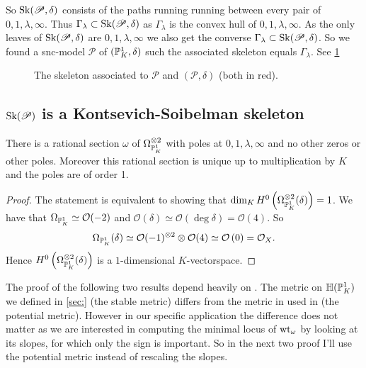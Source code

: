 So $\operatorname{Sk}(\mathscr P, \delta)$ consists of the paths running running between every pair of $0, 1, \lambda, \infty$. Thus $\Gamma_\lambda \subset \operatorname{Sk}(\mathscr P, \delta)$ as $\Gamma_\lambda$ is the convex hull of $0, 1, \lambda, \infty$.
As  the only leaves of $\operatorname{Sk}(\mathscr P, \delta)$ are $0, 1, \lambda, \infty$ we also get the converse $\Gamma_\lambda \subset  \operatorname{Sk}(\mathscr P, \delta)$. 
So we found a snc-model $\mathscr P$ of $(\mathbb{P}^{1}_K, \delta)$ such the associated skeleton equals $\Gamma_\lambda$. 
See \cref{fig:skeleton_of_the_pair}

\begin{figure}[ht]
    \centering
    \caption{The skeleton associated to $\mathscr P$ and $(\mathscr P, \delta)$ (both in red).}
    \label{fig:skeleton_of_the_pair}
\end{figure}

\subsection{$\operatorname{Sk}(\mathscr P)$ is a Kontsevich-Soibelman skeleton} \label{sec:sk_P_is_a_kontsevich-soibelman_skeleton}

\begin{lemma}\label{lem:unique_form_pair}
	There is a rational section $\omega$ of $\Omega_{\mathbb{P}^{1}_K}^{\otimes 2}$ with poles at  $0, 1, \lambda, \infty$ and no other zeros or other poles. 
	Moreover this rational section is unique up to multiplication by $K$ and the poles are of order 1. 
\end{lemma}
\begin{proof}
	The statement is equivalent to showing that $\dim_K H^{0}\left(\Omega_{\mathbb{P}^{1}_K}^{\otimes 2}(\delta)\right)  = 1$.
	We have that $\Omega_{\mathbb{P}^{1}_K} \simeq \mathcal{O}(-2)$ and $\mathcal{O}(\delta) \simeq \mathcal{O}(\deg \delta) = \mathcal{O}(4)$.
	So \[
		\Omega_{\mathbb{P}^{1}_K} (\delta) \simeq \mathcal{O}(-1)^{\otimes 2} \otimes \mathcal{O}(4) \simeq \mathcal{O}\left(0 \right)  = \mathcal{O}_X
	.\] 
	Hence $H^{0}\left(\Omega_{\mathbb{P}^{1}_K}^{\otimes 2}(\delta)\right)$ is a $1$-dimensional $K$-vectorspace. 
\end{proof}

The proof of the following two results depend heavily on \cite[thm.\ 3.2.3]{bakerWeightFunctionsBerkovich2016}. 
	The metric on $\mathbb{H}(\mathbb{P}^{1}_K)$ we defined in \cref{sec:} (the stable metric) differs from the metric in used in \cite{bakerWeightFunctionsBerkovich2016} (the potential metric). 
	However in our specific application the difference does not matter as we are interested in computing the minimal locus of $\operatorname{wt}_\omega$ by looking at its slopes, for which only the sign is important.
	So in the next two proof I'll use the potential metric instead of rescaling the slopes.

